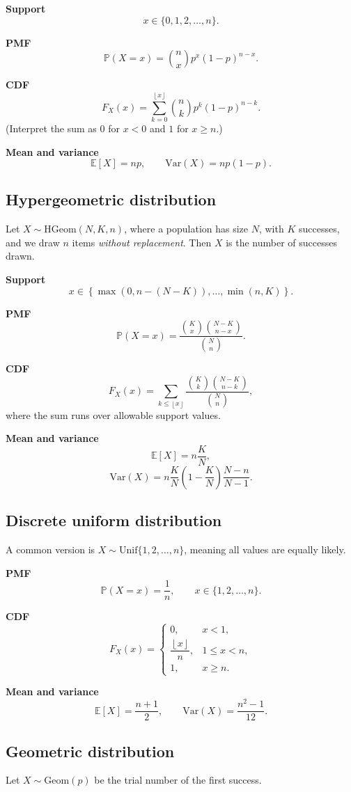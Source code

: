 \documentclass[11pt]{article}
\newcommand{\E}{\mathbb{E}}
\newcommand{\Var}{\mathrm{Var}}
\newcommand{\Prob}{\mathbb{P}}
\newcommand{\1}{\mathbf{1}}
\newcommand{\Geom}{\mathrm{Geom}}
\newcommand{\Unif}{\mathrm{Unif}}
\newcommand{\floor}[1]{\left\lfloor #1 \right\rfloor}
\begin{document}
\textbf{Support}
\[
    x\in\{0,1,2,\dots,n\}.
\]

\textbf{PMF}
\[
    \Prob(X=x)=\binom{n}{x}p^x(1-p)^{n-x}.
\]

\textbf{CDF}
\[
    F_X(x)=\sum_{k=0}^{\floor{x}} \binom{n}{k}p^k(1-p)^{n-k}.
\]
(Interpret the sum as $0$ for $x<0$ and $1$ for $x\ge n$.)

\textbf{Mean and variance}
\[
    \E[X]=np, \qquad \Var(X)=np(1-p).
\]

\subsection{Hypergeometric distribution}
Let $X\sim \mathrm{HGeom}(N,K,n)$, where a population has size $N$, with $K$ successes, and we draw $n$ items \emph{without replacement}. Then $X$ is the number of successes drawn.

\textbf{Support}
\[
    x\in \left\{\max(0,n-(N-K)),\dots,\min(n,K)\right\}.
\]

\textbf{PMF}
\[
    \Prob(X=x)=\frac{\binom{K}{x}\binom{N-K}{n-x}}{\binom{N}{n}}.
\]

\textbf{CDF}
\[
    F_X(x)=\sum_{k\le \floor{x}} \frac{\binom{K}{k}\binom{N-K}{n-k}}{\binom{N}{n}},
\]
where the sum runs over allowable support values.

\textbf{Mean and variance}
\[
    \E[X]=n\frac{K}{N},
\]
\[
    \Var(X)=n\frac{K}{N}\left(1-\frac{K}{N}\right)\frac{N-n}{N-1}.
\]

\subsection{Discrete uniform distribution}
A common version is $X\sim \Unif\{1,2,\dots,n\}$, meaning all values are equally likely.

\textbf{PMF}
\[
    \Prob(X=x)=\frac{1}{n}, \qquad x\in\{1,2,\dots,n\}.
\]

\textbf{CDF}
\[
    F_X(x)=
    \begin{cases}
        0, & x<1,\\
        \dfrac{\floor{x}}{n}, & 1\le x<n,\\
        1, & x\ge n.
    \end{cases}
\]

\textbf{Mean and variance}
\[
    \E[X]=\frac{n+1}{2}, \qquad \Var(X)=\frac{n^2-1}{12}.
\]

\subsection{Geometric distribution}
Let $X\sim \Geom(p)$ be the trial number of the first success.
\end{document}
